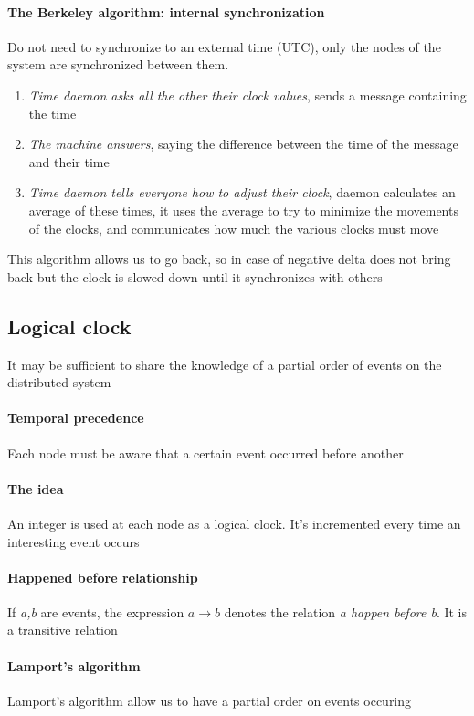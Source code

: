 \paragraph{The Berkeley algorithm: internal synchronization}
Do not need to synchronize to an external time (UTC), only the nodes of the system are synchronized between them.
\begin{enumerate}
    \item \textit{Time daemon asks all the other their clock values}, sends a message containing the time
    \item \textit{The machine answers}, saying the difference between the time of the message and their time
    \item \textit{Time daemon tells everyone how to adjust their clock}, daemon calculates an average of these times, it uses the average to try to minimize the movements of the clocks, and communicates how much the various clocks must move
\end{enumerate}
This algorithm allows us to go back, so in case of negative delta does not bring
back but the clock is slowed down until it synchronizes with others

\subsection{Logical clock}
It may be sufficient to share the knowledge of a partial order of events on the distributed system

\paragraph{Temporal precedence}
Each node must be aware that a certain event occurred before another 

\paragraph{The idea}
An integer is used at each node as a logical clock. It’s incremented every time an interesting event occurs

\paragraph{Happened before relationship}
If \textit{a,b} are events, the expression $a \rightarrow b$ denotes the relation \textit{a happen before b}. It is a transitive relation

\paragraph{Lamport’s algorithm}
Lamport’s algorithm allow us to have a partial order on events occuring

